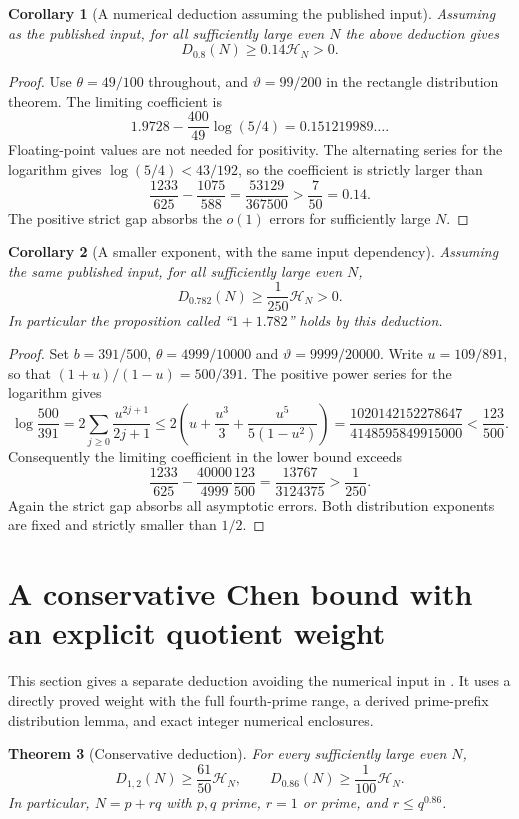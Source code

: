 \documentclass[11pt]{article}
\newtheorem{theorem}{Theorem}
\newtheorem{corollary}[theorem]{Corollary}
\newcommand{\HN}{\mathcal H_N}
\begin{document}
\begin{corollary}[A numerical deduction assuming the published input]
Assuming \cite[Theorem 1.1]{Li2026} as the published input, for all
sufficiently large even $N$ the above deduction gives
\[
 D_{0.8}(N)\ge0.14\HN>0.
\]
\end{corollary}
\begin{proof}
Use $\theta=49/100$ throughout, and $\vartheta=99/200$ in the rectangle
distribution theorem. The limiting coefficient is
\[
 1.9728-\frac{400}{49}\log(5/4)=0.151219989\ldots .
\]
Floating-point values are not needed for positivity. The alternating
series for the logarithm gives $\log(5/4)<43/192$, so the coefficient is
strictly larger than
\[
 \frac{1233}{625}-\frac{1075}{588}
 =\frac{53129}{367500}>\frac7{50}=0.14.
\]
The positive strict gap absorbs the $o(1)$ errors for sufficiently large
$N$.
\end{proof}

\begin{corollary}[A smaller exponent, with the same input dependency]
Assuming the same published input, for all sufficiently large even $N$,
\[
 D_{0.782}(N)\ge\frac1{250}\HN>0.
\]
In particular the proposition called ``$1+1.782$'' holds by this deduction.
\end{corollary}
\begin{proof}
Set $b=391/500$, $\theta=4999/10000$ and
$\vartheta=9999/20000$. Write $u=109/891$, so that
$(1+u)/(1-u)=500/391$. The positive power series for the logarithm gives
\[
 \log\frac{500}{391}
 =2\sum_{j\ge0}\frac{u^{2j+1}}{2j+1}
 \le2\left(u+\frac{u^3}{3}+\frac{u^5}{5(1-u^2)}\right)
 =\frac{1020142152278647}{4148595849915000}
 <\frac{123}{500}.
\]
Consequently the limiting coefficient in the lower bound exceeds
\[
 \frac{1233}{625}-\frac{40000}{4999}\frac{123}{500}
 =\frac{13767}{3124375}>\frac1{250}.
\]
Again the strict gap absorbs all asymptotic errors. Both distribution
exponents are fixed and strictly smaller than $1/2$.
\end{proof}

\section{A conservative Chen bound with an explicit quotient weight}\label{sec:conservative}
This section gives a separate deduction avoiding the numerical input
in \cite{Li2026}. It uses a directly proved weight with the full
fourth-prime range, a derived prime-prefix distribution lemma, and
exact integer numerical enclosures.
\begin{theorem}[Conservative deduction]\label{thm:conservative}
For every sufficiently large even $N$,
\[
 D_{1,2}(N)\ge\frac{61}{50}\HN,
 \qquad D_{0.86}(N)\ge\frac1{100}\HN.
\]
In particular, $N=p+rq$ with $p,q$ prime, $r=1$ or prime,
and $r\le q^{0.86}$.
\end{theorem}
\end{document}
